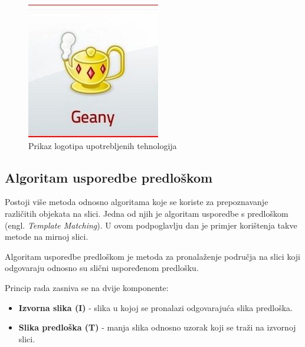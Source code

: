 \begin{figure}[!htb]
\endminipage\hfill
{}%
    \includegraphics[width=\linewidth]{figures/geany.jpg}
\endminipage
\caption{Prikaz logotipa upotrebljenih tehnologija}
\end{figure}


\newpage

\subsection{Algoritam usporedbe predloškom} %
\label{sub:Algoritam usporedbe predloškom}

Postoji više metoda odnosno algoritama koje se koriste za prepoznavanje
različitih objekata na slici. Jedna od njih je algoritam usporedbe s
predloškom~\cite{web:opencv} (engl. \textit{Template Matching}). U ovom
podpoglavlju dan je primjer korištenja takve metode na mirnoj slici. 

Algoritam usporedbe predloškom je metoda za pronalaženje područja na
slici koji odgovaraju odnosno su slični uspoređenom predlošku. 

Princip rada zasniva se na dvije komponente:
\begin{itemize}
    \item \textbf{Izvorna slika (I)} - slika u kojoj se pronalazi
        odgovarajuća slika predloška.
    \item \textbf{Slika predloška (T)} - manja slika odnosno uzorak koji
        se traži na izvornoj slici.
\end{itemize}


